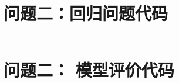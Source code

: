 \documentclass[withoutpreface,bwprint]{cumcmthesis}
\begin{document}
\begin{appendices}
    \begin{lstlisting}[language=Python]

    \end{lstlisting}

    \section{问题二：回归问题代码}

    \begin{lstlisting}[language=Python]

    \end{lstlisting}

    \section{问题二： 模型评价代码}

    \begin{lstlisting}[language=Python]

    \end{lstlisting}

\end{appendices}
\end{document}
